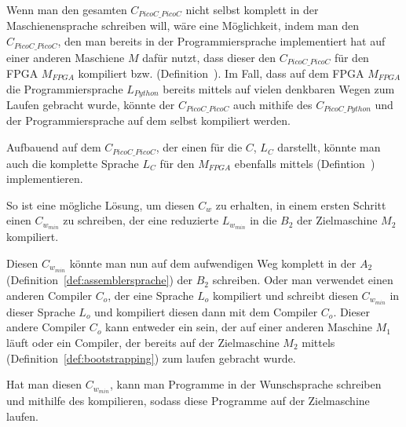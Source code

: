 Wenn man den gesamten  $C_{PicoC\_PicoC}$ nicht selbst komplett in der Maschienensprache  schreiben will, wäre eine Möglichkeit, indem man den  $C_{PicoC\_PicoC}$, den man bereits in der Programmiersprache  implementiert hat auf einer anderen Maschiene $M$ dafür nutzt, dass dieser den  $C_{PicoC\_PicoC}$ für den FPGA $M_{FPGA}$ kompiliert bzw.  (Definition~). Im Fall, dass auf dem FPGA $M_{FPGA}$ die Programmiersprache $L_{Python}$ bereits mittels  auf vielen denkbaren Wegen zum Laufen gebracht wurde, könnte der  $C_{PicoC\_PicoC}$ auch mithife des  $C_{PicoC\_Python}$ und der Programmiersprache  auf dem  selbst kompiliert werden.

Aufbauend auf dem  $C_{PicoC\_PicoC}$, der einen  für die  $C$, $L_C$ darstellt, könnte man auch die komplette Sprache $L_C$ für den  $M_{FPGA}$ ebenfalls mittels  (Defintion~) implementieren.

So ist eine mögliche Lösung, um diesen  $C_w$ zu erhalten, in einem ersten Schritt einen  $C_{w_{min}}$ zu schreiben, der eine reduzierte  $L_{w_{min}}$ in die  $B_2$ der Zielmaschine $M_2$ kompiliert.

Diesen  $C_{w_{min}}$ könnte man nun auf dem aufwendigen Weg komplett in der  $A_2$ (Definition~\ref{def:assemblersprache}) der  $B_2$ schreiben. Oder man verwendet einen anderen Compiler $C_o$, der eine Sprache $L_o$ kompiliert und schreibt diesen  $C_{w_{min}}$ in dieser Sprache $L_o$ und kompiliert diesen dann mit dem Compiler $C_o$. Dieser andere Compiler $C_o$ kann entweder ein  sein, der auf einer anderen Maschine $M_1$ läuft oder ein Compiler, der bereits auf der Zielmaschine $M_2$ mittels  (Definition~\ref{def:bootstrapping}) zum laufen gebracht wurde.

Hat man diesen  $C_{w_{min}}$, kann man Programme in der Wunschsprache schreiben und mithilfe des  kompilieren, sodass diese Programme auf der Zielmaschine laufen.

